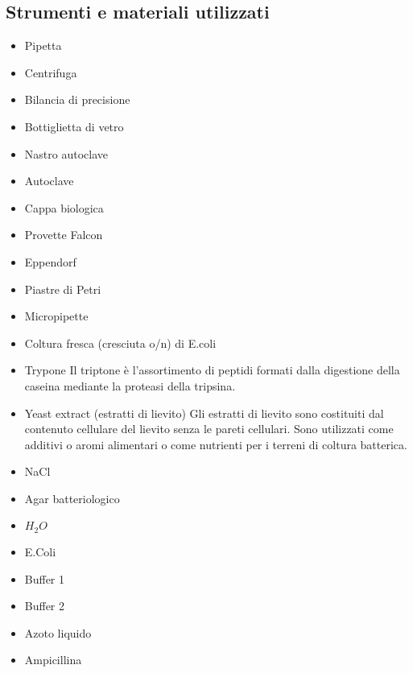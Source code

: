 \documentclass{extarticle}
\begin{document}
\subsection*{Strumenti e materiali utilizzati}
\begin{minipage}{0.5\textwidth}
    \begin{itemize}
        \item Pipetta
        \item Centrifuga
        \item Bilancia di precisione
        \item Bottiglietta di vetro
        \item Nastro autoclave
        \item Autoclave
        \item Cappa biologica
        \item Provette Falcon
        \item Eppendorf
        \item Piastre di Petri
        \item Micropipette
        \item Coltura fresca (cresciuta o/n) di E.coli
    \end{itemize}
\end{minipage} \hfill
\begin{minipage}{0.50\textwidth} 
    \begin{itemize}
        \item Trypone
        \subitem Il triptone è l'assortimento di peptidi formati dalla digestione della caseina mediante la proteasi della tripsina.
        \item Yeast extract (estratti di lievito)
        \subitem Gli estratti di lievito sono costituiti dal contenuto cellulare del lievito senza le pareti cellulari. Sono utilizzati come additivi o aromi alimentari o come nutrienti per i terreni di coltura batterica.
        \item NaCl
        \item Agar batteriologico
        \item $H_{2}O$
        \item E.Coli
        \item Buffer 1
        \item Buffer 2
        \item Azoto liquido
        \item Ampicillina
    \end{itemize}
\end{minipage}
\end{document}
